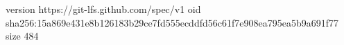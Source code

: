 version https://git-lfs.github.com/spec/v1
oid sha256:15a869e431e8b126183b29ce7fd555ecddfd56c61f7e908ea795ea5b9a691f77
size 484
